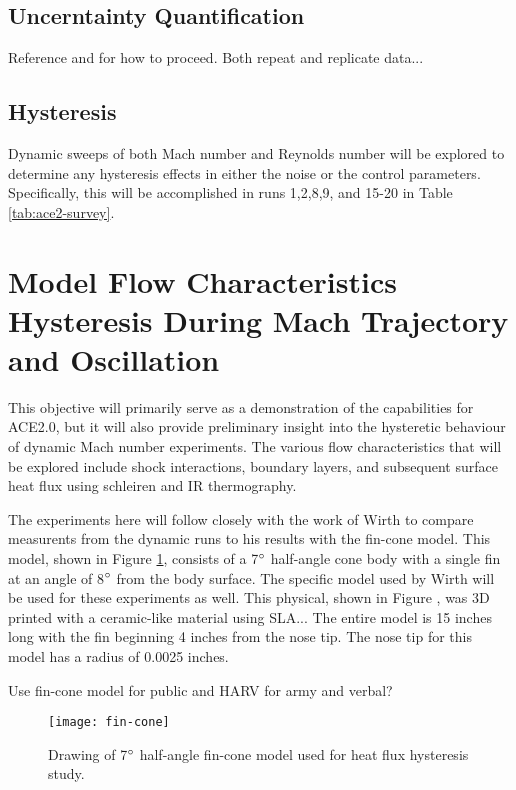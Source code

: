 \subsection{Uncerntainty Quantification}

Reference \cite{stephens-hubbard} and \cite{curriston} for how to proceed. Both repeat and replicate data...

\subsection{Hysteresis}

Dynamic sweeps of both Mach number and Reynolds number will be explored to determine any hysteresis effects in either the noise or the control parameters. Specifically, this will be accomplished in runs 1,2,8,9, and 15-20 in Table \ref{tab:ace2-survey}.

\section{Model Flow Characteristics Hysteresis During Mach Trajectory and Oscillation}

This objective will primarily serve as a demonstration of the capabilities for ACE2.0, but it will also provide preliminary insight into the hysteretic behaviour of dynamic Mach number experiments. The various flow characteristics that will be explored include shock interactions, boundary layers, and subsequent surface heat flux using schleiren and IR thermography.

The experiments here will follow closely with the work of Wirth \cite{wirth} to compare measurents from the dynamic runs to his results with the fin-cone model. This model, shown in Figure \ref{fig:fin-cone}, consists of a 7$\degree$ half-angle cone body with a single fin at an angle of 8$\degree$ from the body surface. The specific model used by Wirth will be used for these experiments as well. This physical, shown in Figure , was 3D printed with a ceramic-like material using SLA... The entire model is 15 inches long with the fin beginning 4 inches from the nose tip. The nose tip for this model has a radius of 0.0025 inches. 

Use fin-cone model for public and HARV for army and verbal?

\begin{figure}[ht]
    \centering
    \texttt{[image: fin-cone]}
    \caption{Drawing of 7$\degree$ half-angle fin-cone model used for heat flux hysteresis study.}
    \label{fig:fin-cone}
\end{figure}


